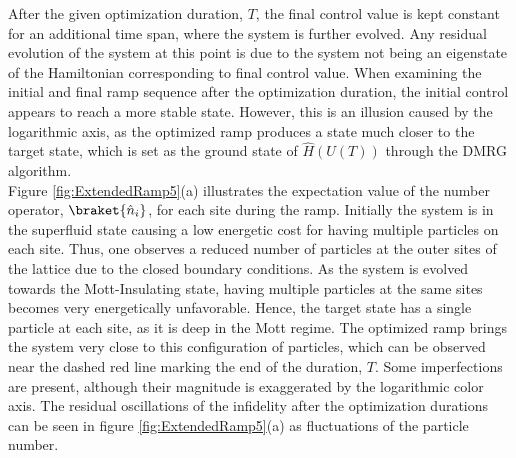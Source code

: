 After the given optimization duration, $T$, the final control value is kept constant for an additional time span, where the system is further evolved. Any residual evolution of the system at this point is due to the system not being an eigenstate of the Hamiltonian corresponding to final control value. When examining the initial and final ramp sequence after the optimization duration, the initial control appears to reach a more stable state. However, this is an illusion caused by the logarithmic axis, as the optimized ramp produces a state much closer to the target state, which is set as the ground state of $\hat{H}(U(T))$ through the DMRG algorithm.\\ 
Figure \ref{fig:ExtendedRamp5}(a) illustrates the expectation value of the number operator, $\braket{\hat{n}_i}$, for each site during the ramp. Initially the system is in the superfluid state causing a low energetic cost for having multiple particles on each site. Thus, one observes a reduced number of particles at the outer sites of the lattice due to the closed boundary conditions. As the system is evolved towards the Mott-Insulating state, having multiple particles at the same sites becomes very energetically unfavorable. Hence, the target state has a single particle at each site, as it is deep in the Mott regime. The optimized ramp brings the system very close to this configuration of particles, which can be observed near the dashed red line marking the end of the duration, $T$. Some imperfections are present, although their magnitude is exaggerated by the logarithmic color axis. The residual oscillations of the infidelity after the optimization durations can be seen in figure \ref{fig:ExtendedRamp5}(a) as fluctuations of the particle number. 


